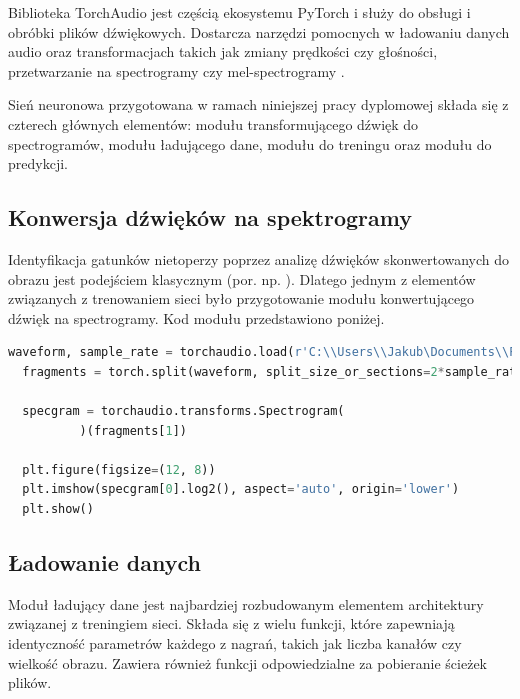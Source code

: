 \documentclass{sprz}
\begin{document}
Biblioteka TorchAudio jest częścią ekosystemu PyTorch i służy do obsługi i obróbki plików dźwiękowych. Dostarcza narzędzi pomocnych w ładowaniu danych audio oraz transformacjach takich jak zmiany prędkości czy głośności, przetwarzanie na spectrogramy czy mel-spectrogramy \cite{torchaudio}. 

Sień neuronowa przygotowana w ramach niniejszej pracy dyplomowej składa się z czterech głównych elementów: modułu transformującego dźwięk do spectrogramów, modułu ładującego dane, modułu do treningu oraz modułu do predykcji.

\subsection{Konwersja dźwięków na spektrogramy}
Identyfikacja gatunków nietoperzy poprzez analizę dźwięków skonwertowanych do obrazu jest podejściem klasycznym (por. np. \cite{bats-id-dl2020b}). Dlatego jednym z elementów związanych z trenowaniem sieci było przygotowanie modułu konwertującego dźwięk na spectrogramy. Kod modułu przedstawiono poniżej.

\begin{lstlisting}[language=Python,caption={Implementacja konwersji dźwięku na spektrogram}, label={lst:audio-to-spectrogram}]
  waveform, sample_rate = torchaudio.load(r'C:\\Users\\Jakub\Documents\\PJATK\\INZ\Batmonit_model\\Chiro_sounds_signed\Audio\\PIPNAT\S4U08639_20210731_234142_PIPNAT.wav')
  fragments = torch.split(waveform, split_size_or_sections=2*sample_rate, dim=1)
  
  specgram = torchaudio.transforms.Spectrogram(
          )(fragments[1])
  
  plt.figure(figsize=(12, 8))
  plt.imshow(specgram[0].log2(), aspect='auto', origin='lower')
  plt.show()
\end{lstlisting}


\subsection{Ładowanie danych}

Moduł ładujący dane jest najbardziej rozbudowanym elementem architektury związanej z treningiem sieci. Składa się z wielu funkcji, które zapewniają identyczność parametrów każdego z nagrań, takich jak liczba kanałów czy wielkość obrazu. Zawiera również funkcji odpowiedzialne za pobieranie ścieżek plików.
\end{document}
